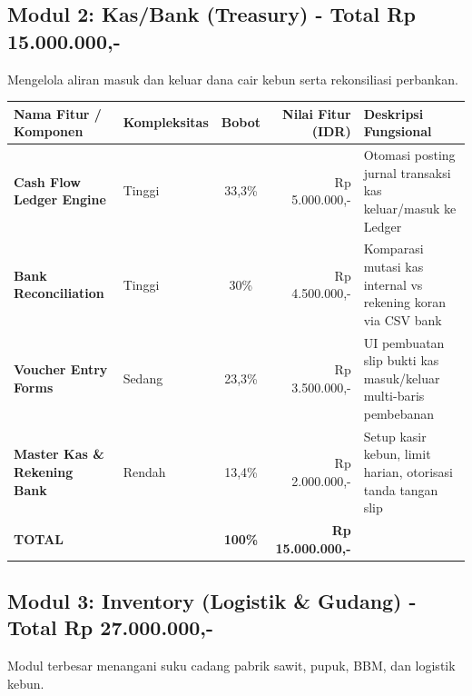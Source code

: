 \documentclass[11pt,a4paper]{article}
\begin{document}
\subsection{Modul 2: Kas/Bank (Treasury) - Total Rp 15.000.000,-}
Mengelola aliran masuk dan keluar dana cair kebun serta rekonsiliasi perbankan.

\begin{table}[h!]
\centering
\scriptsize
\begin{tabular}{llcrl}
    \toprule
    \textbf{Nama Fitur / Komponen} & \textbf{Kompleksitas} & \textbf{Bobot} & \textbf{Nilai Fitur (IDR)} & \textbf{Deskripsi Fungsional} \\
    \midrule
    \textbf{Cash Flow Ledger Engine} & Tinggi & 33,3\% & Rp 5.000.000,- & Otomasi posting jurnal transaksi kas keluar/masuk ke Ledger \\
    \textbf{Bank Reconciliation} & Tinggi & 30\% & Rp 4.500.000,- & Komparasi mutasi kas internal vs rekening koran via CSV bank \\
    \textbf{Voucher Entry Forms} & Sedang & 23,3\% & Rp 3.500.000,- & UI pembuatan slip bukti kas masuk/keluar multi-baris pembebanan \\
    \textbf{Master Kas \& Rekening Bank} & Rendah & 13,4\% & Rp 2.000.000,- & Setup kasir kebun, limit harian, otorisasi tanda tangan slip \\
    \midrule
    \textbf{TOTAL} & & \textbf{100\%} & \textbf{Rp 15.000.000,-} & \\
    \bottomrule
\end{tabular}
\end{table}

\subsection{Modul 3: Inventory (Logistik \& Gudang) - Total Rp 27.000.000,-}
Modul terbesar menangani suku cadang pabrik sawit, pupuk, BBM, dan logistik kebun.
\end{document}
